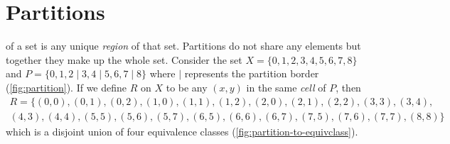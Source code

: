 \documentclass[10pt]{book}
\newcommand{\newthought}[1]{\vspace{0.5\baselineskip}\noindent{\scshape #1}}
\begin{document}
\section{Partitions}
\newthought{A partition} of a set is any unique \emph{region} of that set. Partitions do not share any elements but together
they make up the whole set. Consider the set $X=\{0,1,2,3,4,5,6,7,8\}$ and $P = \{0,1,2 \mid 3,4 \mid 5,6,7 \mid 8\}$
where $|$ represents the partition border (\cref{fig:partition}). If we define $R$ on $X$ to be any $(x,y)$ in the same \emph{cell} of $P$,
then
\begin{align*}
  R = \{(0,0),(0,1),(0,2),(1,0),(1,1),(1,2),(2,0),(2,1),(2,2),(3,3),(3,4),\\
  (4,3),(4,4),(5,5),(5,6),(5,7),(6,5),(6,6),(6,7),(7,5),(7,6),(7,7),(8,8)\}
\end{align*}
which is a disjoint union of four equivalence classes (\cref{fig:partition-to-equivclass}).
\end{document}
